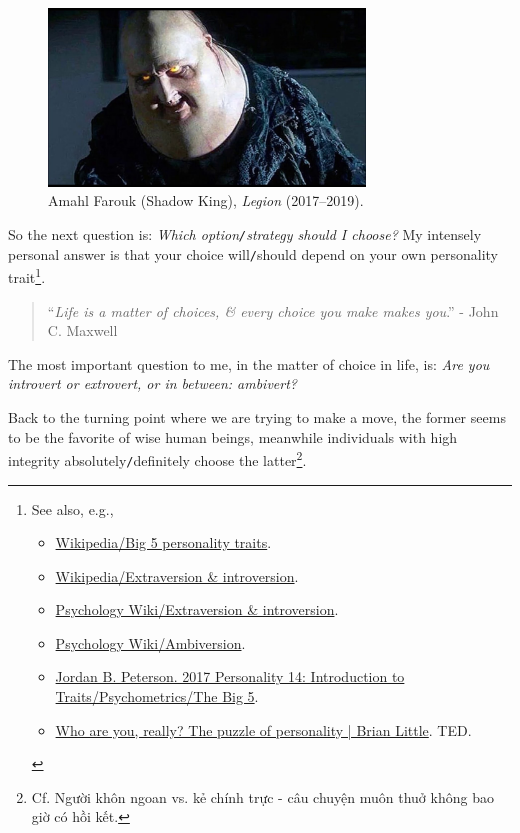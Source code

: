 \documentclass[12pt]{article}
\begin{document}
\begin{figure}[H]
	\centering
	\includegraphics[width=0.75\textwidth]{Shadow_King}
	\caption{Amahl Farouk (Shadow King), {\it Legion} (2017--2019).}
	\label{fig3}
\end{figure}
So the next question is: {\it Which option{\tt/}strategy should I choose?} My intensely personal answer is that your choice will{\tt/}should depend on your own personality trait\footnote{See also, e.g.,
	\begin{itemize}
		\item \href{https://en.wikipedia.org/wiki/Big_Five_personality_traits}{Wikipedia/Big 5 personality traits}.
		\item \href{https://en.wikipedia.org/wiki/Extraversion_and_introversion}{Wikipedia/Extraversion \& introversion}.
		\item \href{https://psychology.wikia.org/wiki/Extraversion_and_introversion}{Psychology Wiki/Extraversion \& introversion}.
		\item \href{https://psychology.wikia.org/wiki/Ambiversion}{Psychology Wiki/Ambiversion}.
		\item \href{https://www.youtube.com/watch?v=pCceO_D4AlY}{Jordan B. Peterson. 2017 Personality 14: Introduction to Traits/Psychometrics/The Big 5}.
		\item \href{https://www.youtube.com/watch?v=qYvXk_bqlBk}{Who are you, really? The puzzle of personality | Brian Little}. TED.
\end{itemize}}.
\begin{quotation}
	``{\it Life is a matter of choices, \& every choice you make makes you}.'' - John C. Maxwell
\end{quotation}
The most important question to me, in the matter of choice in life, is: {\it Are you introvert or extrovert, or in between: ambivert?}

Back to the turning point where we are trying to make a move, the former seems to be the favorite of wise human beings, meanwhile individuals with high integrity absolutely{\tt/}definitely choose the latter\footnote{Cf. Người khôn ngoan vs. kẻ chính trực - câu chuyện muôn thuở không bao giờ có hồi kết.}.
\end{document}
